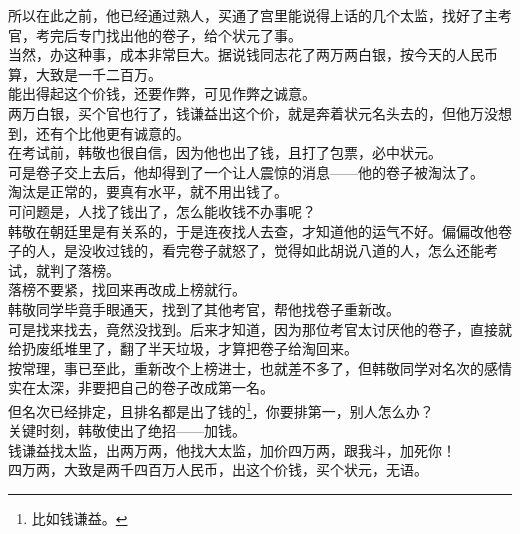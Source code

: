 \begin{multicols}{\theparacolNo}
所以在此之前，他已经通过熟人，买通了宫里能说得上话的几个太监，找好了主考官，考完后专门找出他的卷子，给个状元了事。\\

当然，办这种事，成本非常巨大。据说钱同志花了两万两白银，按今天的人民币算，大致是一千二百万。\\

能出得起这个价钱，还要作弊，可见作弊之诚意。\\

两万白银，买个官也行了，钱谦益出这个价，就是奔着状元名头去的，但他万没想到，还有个比他更有诚意的。\\

在考试前，韩敬也很自信，因为他也出了钱，且打了包票，必中状元。\\

可是卷子交上去后，他却得到了一个让人震惊的消息——他的卷子被淘汰了。\\

淘汰是正常的，要真有水平，就不用出钱了。\\

可问题是，人找了钱出了，怎么能收钱不办事呢？\\

韩敬在朝廷里是有关系的，于是连夜找人去查，才知道他的运气不好。偏偏改他卷子的人，是没收过钱的，看完卷子就怒了，觉得如此胡说八道的人，怎么还能考试，就判了落榜。\\

落榜不要紧，找回来再改成上榜就行。\\

韩敬同学毕竟手眼通天，找到了其他考官，帮他找卷子重新改。\\

可是找来找去，竟然没找到。后来才知道，因为那位考官太讨厌他的卷子，直接就给扔废纸堆里了，翻了半天垃圾，才算把卷子给淘回来。\\

按常理，事已至此，重新改个上榜进士，也就差不多了，但韩敬同学对名次的感情实在太深，非要把自己的卷子改成第一名。\\

但名次已经排定，且排名都是出了钱的\footnote{比如钱谦益。}，你要排第一，别人怎么办？\\

关键时刻，韩敬使出了绝招——加钱。\\

钱谦益找太监，出两万两，他找大太监，加价四万两，跟我斗，加死你！\\

四万两，大致是两千四百万人民币，出这个价钱，买个状元，无语。\\


\end{multicols}

